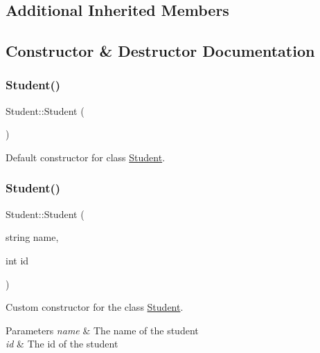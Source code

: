 \subsection*{Additional Inherited Members}


\subsection{Constructor \& Destructor Documentation}
\mbox{\label{class_student_af9168cedbfa5565cf0b20c1a9d3f5c9d}} 
\subsubsection{\texorpdfstring{Student()}{Student()}\hspace{0.1cm}{\footnotesize\ttfamily [1/2]}}
{\footnotesize\ttfamily Student\+::\+Student (\begin{DoxyParamCaption}{ }\end{DoxyParamCaption})}



Default constructor for class \hyperlink{class_student}{Student}. 

\mbox{\label{class_student_afc317f470d694b6ef52387a4e21a1e08}} 
\subsubsection{\texorpdfstring{Student()}{Student()}\hspace{0.1cm}{\footnotesize\ttfamily [2/2]}}
{\footnotesize\ttfamily Student\+::\+Student (\begin{DoxyParamCaption}\item[{string}]{name,  }\item[{int}]{id }\end{DoxyParamCaption})}



Custom constructor for the class \hyperlink{class_student}{Student}. 


\begin{DoxyParams}{Parameters}
{\em name} & The name of the student \\
\hline
{\em id} & The id of the student \\
\hline
\end{DoxyParams}
\mbox{\label{class_student_a71f6d37e021e98dff29ffe67bfac6ce1}} 
